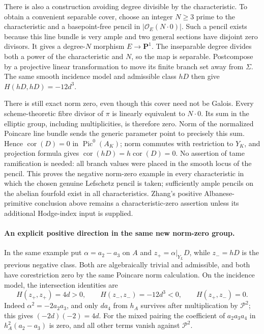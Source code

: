 \documentclass[11pt,a4paper]{article}
\begin{document}
There is also a construction avoiding degree divisible by the
characteristic. To obtain
a convenient separable cover, choose an integer $N\ge3$ prime to
the characteristic and a basepoint-free pencil in
$|\mathcal O_E(N\cdot0)|$. Such a pencil exists because this line
bundle is very ample and two general sections have disjoint zero
divisors. It gives a degree-$N$ morphism $E\to\mathbf P^1$.
The inseparable degree divides both a power of the characteristic
and $N$, so the map is separable. Postcompose by a projective
linear transformation to move its finite branch set away from
$\Sigma$. The same smooth incidence model and admissible class
$hD$ then give $H(hD,hD)=-12d^3$.

There is still exact norm zero, even though this cover need not be
Galois. Every scheme-theoretic fibre divisor of $\pi$ is linearly
equivalent to $N\cdot0$. Its sum in the elliptic group, including
multiplicities, is therefore zero. Norm of the normalized Poincare
line bundle sends the generic parameter point to precisely this
sum. Hence $\operatorname{cor}(D)=0$ in
$\operatorname{Pic}^0(A_K)$; norm commutes with restriction to
$Y_K$, and projection formula gives
$\operatorname{cor}(hD)=h\operatorname{cor}(D)=0$.
No assertion of tame ramification is needed: all branch values
were placed in the smooth locus of the pencil. This proves the
negative norm-zero example in every characteristic in which the
chosen genuine Lefschetz pencil is taken; sufficiently ample
pencils on the abelian fourfold exist in all characteristics.
Zhang's positive Albanese-primitive conclusion above remains a
characteristic-zero assertion unless its additional Hodge-index
input is supplied.

\paragraph{An explicit positive direction in the same new norm-zero group.}
In the same example put $\alpha=a_2-a_3$ on $A$ and
$z_+=\alpha|_{Y_L}D$, while $z_-=hD$ is the previous negative
class. Both are algebraically trivial and admissible, and both
have corestriction zero by the same Poincare norm calculation.
On the incidence model, the intersection identities are
\[
 H(z_+,z_+)=4d>0,\qquad H(z_-,z_-)=-12d^3<0,
                   \qquad H(z_+,z_-)=0.                    \tag{H9.85a}
\]
Indeed $\alpha^2=-2a_2a_3$, and only $d a_4$ from $h_A$
survives after multiplication by $\mathcal P^2$; this gives
$(-2d)(-2)=4d$. For the mixed pairing the coefficient of
$a_2a_3a_4$ in $h_A^2(a_2-a_3)$ is zero, and all other terms
vanish against $\mathcal P^2$.
\end{document}
